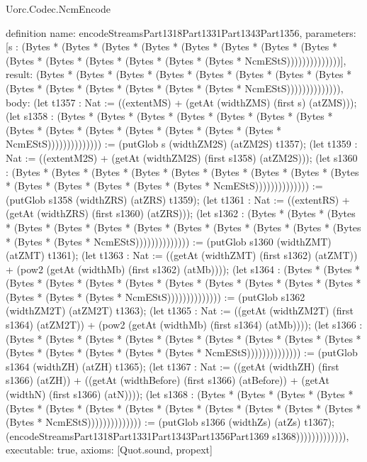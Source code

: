 \begin{lexlean}{Uorc.Codec.NcmEncode}
\begin{semanticmodule}
definition{
  name: encodeStreamsPart1318Part1331Part1343Part1356,
  parameters: [s : (Bytes * (Bytes * (Bytes * (Bytes * (Bytes * (Bytes * (Bytes * (Bytes * (Bytes * (Bytes * (Bytes * (Bytes * (Bytes * (Bytes * NcmEStS))))))))))))))],
  result: (Bytes * (Bytes * (Bytes * (Bytes * (Bytes * (Bytes * (Bytes * (Bytes * (Bytes * (Bytes * (Bytes * (Bytes * (Bytes * (Bytes * NcmEStS)))))))))))))),
  body: (let t1357 : Nat := ((extentMS) + (getAt (widthZMS) (first s) (atZMS))); (let s1358 : (Bytes * (Bytes * (Bytes * (Bytes * (Bytes * (Bytes * (Bytes * (Bytes * (Bytes * (Bytes * (Bytes * (Bytes * (Bytes * (Bytes * NcmEStS)))))))))))))) := (putGlob s (widthZM2S) (atZM2S) t1357); (let t1359 : Nat := ((extentM2S) + (getAt (widthZM2S) (first s1358) (atZM2S))); (let s1360 : (Bytes * (Bytes * (Bytes * (Bytes * (Bytes * (Bytes * (Bytes * (Bytes * (Bytes * (Bytes * (Bytes * (Bytes * (Bytes * (Bytes * NcmEStS)))))))))))))) := (putGlob s1358 (widthZRS) (atZRS) t1359); (let t1361 : Nat := ((extentRS) + (getAt (widthZRS) (first s1360) (atZRS))); (let s1362 : (Bytes * (Bytes * (Bytes * (Bytes * (Bytes * (Bytes * (Bytes * (Bytes * (Bytes * (Bytes * (Bytes * (Bytes * (Bytes * (Bytes * NcmEStS)))))))))))))) := (putGlob s1360 (widthZMT) (atZMT) t1361); (let t1363 : Nat := ((getAt (widthZMT) (first s1362) (atZMT)) + (pow2 (getAt (widthMb) (first s1362) (atMb)))); (let s1364 : (Bytes * (Bytes * (Bytes * (Bytes * (Bytes * (Bytes * (Bytes * (Bytes * (Bytes * (Bytes * (Bytes * (Bytes * (Bytes * (Bytes * NcmEStS)))))))))))))) := (putGlob s1362 (widthZM2T) (atZM2T) t1363); (let t1365 : Nat := ((getAt (widthZM2T) (first s1364) (atZM2T)) + (pow2 (getAt (widthMb) (first s1364) (atMb)))); (let s1366 : (Bytes * (Bytes * (Bytes * (Bytes * (Bytes * (Bytes * (Bytes * (Bytes * (Bytes * (Bytes * (Bytes * (Bytes * (Bytes * (Bytes * NcmEStS)))))))))))))) := (putGlob s1364 (widthZH) (atZH) t1365); (let t1367 : Nat := ((getAt (widthZH) (first s1366) (atZH)) + ((getAt (widthBefore) (first s1366) (atBefore)) + (getAt (widthN) (first s1366) (atN)))); (let s1368 : (Bytes * (Bytes * (Bytes * (Bytes * (Bytes * (Bytes * (Bytes * (Bytes * (Bytes * (Bytes * (Bytes * (Bytes * (Bytes * (Bytes * NcmEStS)))))))))))))) := (putGlob s1366 (widthZs) (atZs) t1367); (encodeStreamsPart1318Part1331Part1343Part1356Part1369 s1368))))))))))))),
  executable: true,
  axioms: [Quot.sound, propext]
}


\end{semanticmodule}
\end{lexlean}
